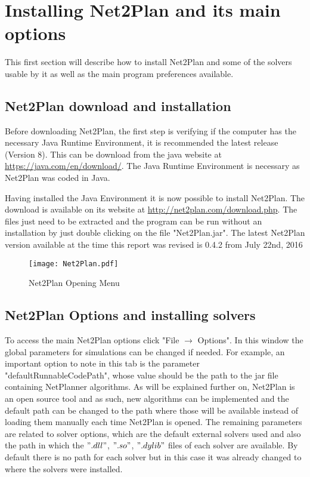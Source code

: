 \clearpage

\section{Installing Net2Plan and its main options}
This first section will describe how to install Net2Plan and some of the solvers usable by it as well as the main program preferences available.


    \subsection{Net2Plan download and installation}
    \vspace{0.5cm}
	Before downloading Net2Plan, the first step is verifying if the computer has the necessary Java Runtime Environment, it is recommended the latest release (Version 8). This can be download from the java website at \url{https://java.com/en/download/}. The Java Runtime Environment is necessary as Net2Plan was coded in Java.
		
    Having installed the Java Environment it is now possible to install Net2Plan. The download is available on its website at \url{http://net2plan.com/download.php}. The files just need to be extracted and the program can be run without an installation by just double clicking on the file "Net2Plan.jar". The latest Net2Plan version available at the time this report was revised is 0.4.2 from July 22nd, 2016

    \begin{figure}[h!]
       	\centering
       	\texttt{[image: Net2Plan.pdf]}
       	\caption{Net2Plan Opening Menu}
    \end{figure}

	\subsection{Net2Plan Options and installing solvers}
	\vspace{0.5cm}
	To access the main Net2Plan options click "File $\rightarrow$ Options". In this window the global parameters for simulations can be changed if needed.
	For example, an important option to note in this tab is the parameter "defaultRunnableCodePath", whose value should be the path to the jar file containing NetPlanner algorithms. As will be explained further on, Net2Plan is an open source tool and as such, new algorithms can be implemented and the default path can be changed to the path where those will be available instead of loading them manually each time Net2Plan is opened.	The remaining parameters are related to solver options, which are the default external solvers used and also the path in which the $".dll"$, $".so"$, $".dylib"$ files of each solver are available. By default there is no path for each solver but in this case it was already changed to where the solvers were installed.
	\pagebreak
	
